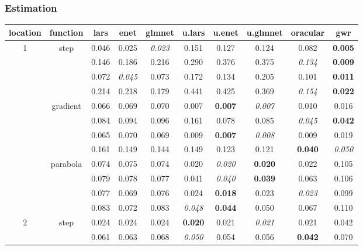 \documentclass[authoryear, review, 11pt]{elsarticle}
\begin{document}
		\subsubsection{Estimation}
		\begin{table}[ht]
		\begin{center}
		\begin{tabular}{cccccccccc}
		  location & function & lars & enet & glmnet & u.lars & u.enet & u.glmnet & oracular & gwr \\ 
		  \hline
		  \multirow{12}{*}{1} & \multirow{4}{*}{step} & 0.046 & 0.025 & \emph{0.023} & 0.151 & 0.127 & 0.124 & 0.082 & \textbf{0.005} \\ 
		  & & 0.146 & 0.186 & 0.216 & 0.290 & 0.376 & 0.375 & \emph{0.134} & \textbf{0.009} \\ 
		  & & 0.072 & \emph{0.045} & 0.073 & 0.172 & 0.134 & 0.205 & 0.101 & \textbf{0.011} \\ 
		  & & 0.214 & 0.218 & 0.179 & 0.441 & 0.425 & 0.369 & \emph{0.154} & \textbf{0.022} \\ 
		  \cline{2-10}
		  & \multirow{4}{*}{gradient} & 0.066 & 0.069 & 0.070 & 0.007 & \textbf{0.007} & \emph{0.007} & 0.010 & 0.016 \\ 
		  & & 0.084 & 0.094 & 0.096 & 0.161 & 0.078 & 0.085 & \emph{0.045} & \textbf{0.042} \\ 
		  & & 0.065 & 0.070 & 0.069 & 0.009 & \textbf{0.007} & \emph{0.008} & 0.009 & 0.019 \\ 
		  & & 0.161 & 0.149 & 0.144 & 0.149 & 0.123 & 0.121 & \textbf{0.040} & \emph{0.050} \\ 
		  \cline{2-10}
		  & \multirow{4}{*}{parabola} & 0.074 & 0.075 & 0.074 & 0.020 & \emph{0.020} & \textbf{0.020} & 0.022 & 0.105 \\ 
		  & & 0.079 & 0.078 & 0.077 & 0.041 & \emph{0.040} & \textbf{0.039} & 0.063 & 0.106 \\ 
		  & & 0.077 & 0.069 & 0.076 & 0.024 & \textbf{0.018} & 0.023 & \emph{0.023} & 0.099 \\ 
		  & & 0.083 & 0.072 & 0.083 & \emph{0.048} & \textbf{0.044} & 0.050 & 0.067 & 0.110 \\ 
		  \hline
		  \multirow{12}{*}{2} & \multirow{4}{*}{step} & 0.024 & 0.024 & 0.024 & \textbf{0.020} & 0.021 & \emph{0.021} & 0.021 & 0.042 \\ 
		  & & 0.061 & 0.063 & 0.068 & \emph{0.050} & 0.054 & 0.056 & \textbf{0.042} & 0.070 \\ 

\end{tabular}
\end{center}
\end{table}
\end{document}
